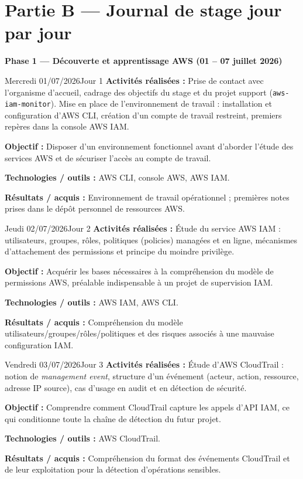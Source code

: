 \documentclass[11pt,a4paper]{article}
\newcommand{\journalfield}[2]{{\color{primaryblue}\textbf{#1 :}} #2\par\smallskip}
\newcommand{\phasebanner}[1]{%
  \begin{center}
  \colorbox{accentorange}{\parbox{0.9\linewidth}{\centering\color{white}\bfseries\large #1}}
  \end{center}
  \vspace{4pt}
}
\begin{document}
\newpage

\section*{Partie B --- Journal de stage jour par jour}

\phasebanner{Phase 1 --- Découverte et apprentissage AWS (01 -- 07 juillet 2026)}

\begin{journalday}{Mercredi 01/07/2026}{Jour 1}
\journalfield{Activités réalisées}{Prise de contact avec l'organisme d'accueil, cadrage des objectifs du stage et du projet support (\texttt{aws-iam-monitor}). Mise en place de l'environnement de travail : installation et configuration d'AWS CLI, création d'un compte de travail restreint, premiers repères dans la console AWS IAM.}
\journalfield{Objectif}{Disposer d'un environnement fonctionnel avant d'aborder l'étude des services AWS et de sécuriser l'accès au compte de travail.}
\journalfield{Technologies / outils}{AWS CLI, console AWS, AWS IAM.}
\journalfield{Résultats / acquis}{Environnement de travail opérationnel ; premières notes prises dans le dépôt personnel de ressources AWS.}
\end{journalday}

\begin{journalday}{Jeudi 02/07/2026}{Jour 2}
\journalfield{Activités réalisées}{Étude du service AWS IAM : utilisateurs, groupes, rôles, politiques (policies) managées et en ligne, mécanismes d'attachement des permissions et principe du moindre privilège.}
\journalfield{Objectif}{Acquérir les bases nécessaires à la compréhension du modèle de permissions AWS, préalable indispensable à un projet de supervision IAM.}
\journalfield{Technologies / outils}{AWS IAM, AWS CLI.}
\journalfield{Résultats / acquis}{Compréhension du modèle utilisateurs/groupes/rôles/politiques et des risques associés à une mauvaise configuration IAM.}
\end{journalday}

\begin{journalday}{Vendredi 03/07/2026}{Jour 3}
\journalfield{Activités réalisées}{Étude d'AWS CloudTrail : notion de \textit{management event}, structure d'un événement (acteur, action, ressource, adresse IP source), cas d'usage en audit et en détection de sécurité.}
\journalfield{Objectif}{Comprendre comment CloudTrail capture les appels d'API IAM, ce qui conditionne toute la chaîne de détection du futur projet.}
\journalfield{Technologies / outils}{AWS CloudTrail.}
\journalfield{Résultats / acquis}{Compréhension du format des événements CloudTrail et de leur exploitation pour la détection d'opérations sensibles.}
\end{journalday}
\end{document}
